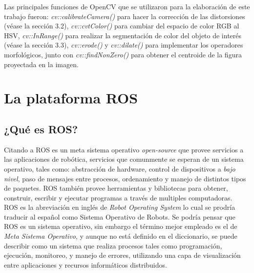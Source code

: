 	Las principales funciones de OpenCV que se utilizaron para la elaboración de este trabajo fueron:  \textit{cv::calibrateCamera()} para hacer la corrección de las distorsiones (véase la sección 3.2), \textit{cv::cvtColor()} para cambiar del espacio de color RGB al HSV, \textit{cv::InRange()} para realizar la segmentación de color del objeto de interés (véase la sección 3.3), \textit{cv::erode()} y \textit{cv::dilate()} para implementar los operadores morfológicos, junto con \textit{cv::findNonZero()} para obtener el centroide de la figura proyectada en la imagen. 
	
	\section{La plataforma ROS}
		\subsection*{¿Qué es ROS?}
Citando a \cite{pyo2015ros} ROS es un meta sistema operativo \textit{open-source} que provee servicios a las aplicaciones de robótica, servicios que comunmente se esperan de un sistema operativo, tales como: abstracción de hardware, control de dispositivos a \textit{bajo nivel}, paso de mensajes entre procesos, ordenamiento y manejo de distintos tipos de paquetes. ROS también provee herramientas y bibliotecas para obtener, construir, escribir y ejecutar programas a través de multiples computadoras.\\

ROS es la abreviación en inglés de \textit{Robot Operating System} lo cual se prodría traducir al español como Sistema Operativo de Robots. Se podría pensar que ROS es un sistema operativo, sin embargo el término mejor empleado es el de \textit{Meta Sistema Operativo}, y aunque no está definido en el diccionario, se puede describir como un sistema que realiza procesos tales como programación, ejecución, monitoreo, y manejo de errores, utilizando una capa de visualización entre aplicaciones y recursos informáticos distribuidos.\\

